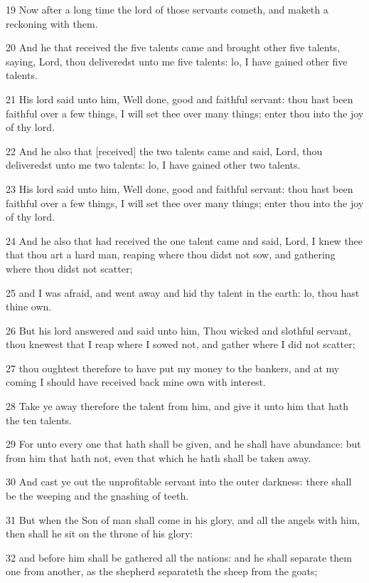 \par 19 Now after a long time the lord of those servants cometh, and maketh a reckoning with them.
\par 20 And he that received the five talents came and brought other five talents, saying, Lord, thou deliveredst unto me five talents: lo, I have gained other five talents.
\par 21 His lord said unto him, Well done, good and faithful servant: thou hast been faithful over a few things, I will set thee over many things; enter thou into the joy of thy lord.
\par 22 And he also that [received] the two talents came and said, Lord, thou deliveredst unto me two talents: lo, I have gained other two talents.
\par 23 His lord said unto him, Well done, good and faithful servant: thou hast been faithful over a few things, I will set thee over many things; enter thou into the joy of thy lord.
\par 24 And he also that had received the one talent came and said, Lord, I knew thee that thou art a hard man, reaping where thou didst not sow, and gathering where thou didst not scatter;
\par 25 and I was afraid, and went away and hid thy talent in the earth: lo, thou hast thine own.
\par 26 But his lord answered and said unto him, Thou wicked and slothful servant, thou knewest that I reap where I sowed not, and gather where I did not scatter;
\par 27 thou oughtest therefore to have put my money to the bankers, and at my coming I should have received back mine own with interest.
\par 28 Take ye away therefore the talent from him, and give it unto him that hath the ten talents.
\par 29 For unto every one that hath shall be given, and he shall have abundance: but from him that hath not, even that which he hath shall be taken away.
\par 30 And cast ye out the unprofitable servant into the outer darkness: there shall be the weeping and the gnashing of teeth.
\par 31 But when the Son of man shall come in his glory, and all the angels with him, then shall he sit on the throne of his glory:
\par 32 and before him shall be gathered all the nations: and he shall separate them one from another, as the shepherd separateth the sheep from the goats;

